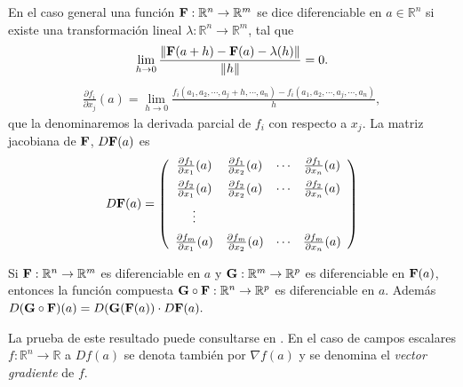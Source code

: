 En el caso general una función ${\bf F}:\mathbb{R}^{n}\rightarrow \mathbb{R}^{m}$ se dice diferenciable en $a\in \mathbb{R}^{n}$ si existe una transformación lineal $\lambda :\mathbb{R}^{n}\rightarrow \mathbb{R}^{m}$, tal que
\[\lim_{h\rightarrow 0}\frac{\left\Vert {\bf F}(a+h)-{\bf F}(a)-\lambda(h)\right\Vert }{\left\Vert h\right\Vert }=0.\]
\begin{gather*}
  \frac{\partial f_i}{\partial x_j}(a)=\lim_{h\rightarrow 0}\frac{f_i(a_1,a_2,\cdots,a_j+h,\cdots,a_n)-f_i(a_1,a_2,\cdots,a_j,\cdots, a_n)}{h},
\end{gather*}
que la denominaremos la derivada parcial de $f_i$ con respecto a $x_j$. 
La matriz jacobiana de ${\bf F}$, $D{\bf F}(a)$ es
\[D{\bf F}(a)=\left(
    \begin{array}{cccc}
      \frac{\partial f_1}{\partial x_1}(a)&\frac{\partial f_1}{\partial x_2}(a)&\cdots & \frac{\partial f_1}{\partial x_n}(a)\\[0.2cm]
      \frac{\partial f_2}{\partial x_1}(a)&\frac{\partial f_2}{\partial x_2}(a)&\cdots & \frac{\partial f_2}{\partial x_n}(a)\\[0.2cm]
      \vdots \\[0.2cm]
      \frac{\partial f_m}{\partial x_1}(a)&\frac{\partial f_m}{\partial x_2}(a)&\cdots & \frac{\partial f_m}{\partial x_n}(a)
\end{array} \right)\]
\begin{teorema}
  Si ${\bf F}:\mathbb{R}^n \to \mathbb{R}^m$ es diferenciable en $a$ y
  ${\bf G}:\mathbb{R}^m \to \mathbb{R}^p$ es diferenciable en ${\bf F}(a)$, entonces la función compuesta
  ${\bf G}\circ {\bf F}:\mathbb{R}^n \to \mathbb{R}^p$ es diferenciable en $a$. Además
  $D({\bf G}\circ {\bf F})(a)=D({\bf G}( {\bf F}(a))\cdot D{\bf F}(a). $
  \end{teorema}
  La prueba de este resultado puede consultarse en \textcite{spivak_calculus_2018}.
  En el caso de campos escalares $f:\mathbb{R}^n \to \mathbb{R}$ a $Df(a)$ se denota también por
  $\nabla f(a)$ y se denomina el \emph{vector gradiente} de $f$. 

